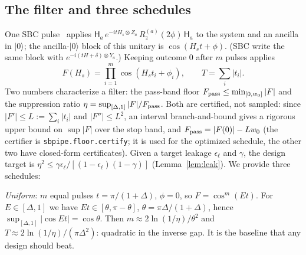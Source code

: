 \documentclass[aps,pra,twocolumn,superscriptaddress,nofootinbib]{revtex4-2}
\newcommand{\ket}[1]{|#1\rangle}
\begin{document}
\subsection{The filter and three schedules}

One SBC pulse~\cite{Stetcu2023} applies $\mathsf H_a\,e^{-itH_s\otimes Z_a}\,R_z^{(a)}(2\phi)\,\mathsf H_a$
to the system and an ancilla in $\ket0$; the ancilla-$\ket0$ block of this unitary is
$\cos(H_st+\phi)$. (SBC write the same block with $e^{-i(tH+\delta)\otimes Y_a}$.) Keeping outcome 0
after $m$ pulses applies
\begin{equation}
F(H_s)=\prod_{i=1}^m\cos(H_st_i+\phi_i),\qquad T=\sum_i|t_i|.
\end{equation}
Two numbers characterize a filter: the pass-band floor $F_{\rm pass}\le\min_{[0,w_0]}|F|$ and the
suppression ratio $\eta=\sup_{[\Delta,1]}|F|/F_{\rm pass}$. Both are certified, not sampled: since
$|F'|\le L:=\sum_i|t_i|$ and $|F''|\le L^2$, an interval branch-and-bound gives a rigorous upper bound
on $\sup|F|$ over the stop band, and $F_{\rm pass}=|F(0)|-Lw_0$ (the certifier is
\texttt{sbpipe.floor.certify}; it is used for the optimized schedule, the other two have
closed-form certificates). Given a target leakage $\epsilon_\ell$ and $\gamma$, the
design target is $\eta^2\le\gamma\epsilon_\ell/[(1-\epsilon_\ell)(1-\gamma)]$ (Lemma~\ref{lem:leak}).
We provide three schedules:

\emph{Uniform}: $m$ equal pulses $t=\pi/(1+\Delta)$, $\phi=0$, so $F=\cos^m(Et)$. For $E\in[\Delta,1]$
we have $Et\in[\theta,\pi-\theta]$, $\theta=\pi\Delta/(1+\Delta)$, hence $\sup_{[\Delta,1]}|\cos Et|=\cos\theta$. Then
$m\approx2\ln(1/\eta)/\theta^2$ and $T\approx2\ln(1/\eta)/(\pi\Delta^2)$: quadratic in the inverse gap.
It is the baseline that any design should beat.
\end{document}
